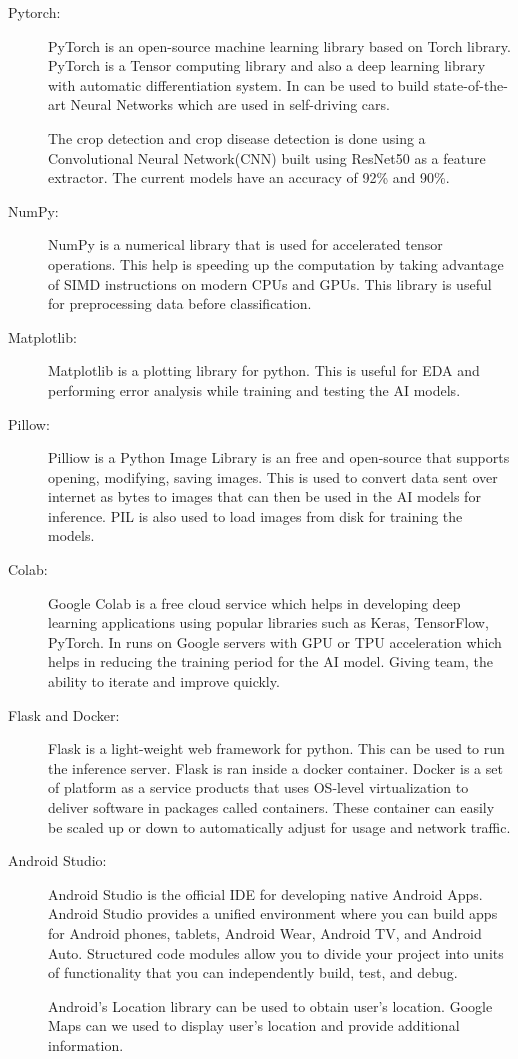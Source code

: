 \documentclass[../Report.tex]{subfiles}
\begin{document}
\begin{description}
  \item[Pytorch:] PyTorch is an open-source machine learning library based on Torch library. PyTorch is a Tensor computing library and also 
  a deep learning library with automatic differentiation system. In can be used to build state-of-the-art Neural Networks which are used in
  self-driving cars.\par
  The crop detection and crop disease detection is done using a Convolutional Neural Network(CNN) built using ResNet50 as a feature extractor.
  The current models have an accuracy of 92\% and 90\%.

  \item[NumPy:] NumPy is a numerical library that is used for accelerated tensor operations. This help is speeding up the computation by 
  taking advantage of SIMD instructions on modern CPUs and GPUs. This library is useful for preprocessing data before classification.

  \item[Matplotlib:] Matplotlib is a plotting library for python. This is useful for EDA and performing error analysis while training 
  and testing the AI models.

  \item[Pillow:] Pilliow is a Python Image Library is an free and open-source that supports opening, modifying, saving images. This is used to convert data
  sent over internet as bytes to images that can then be used in the AI models for inference. PIL is also used to load images from disk for
  training the models.

  \item[Colab:] Google Colab is a free cloud service which helps in developing deep learning applications using popular libraries such 
  as Keras, TensorFlow, PyTorch. In runs on Google servers with GPU or TPU acceleration which helps in reducing the training period for 
  the AI model. Giving team, the ability to iterate and improve quickly.

  \item[Flask and Docker:] Flask is a light-weight web framework for python. This can be used to run the inference server. Flask is ran
  inside a docker container. Docker is a set of platform as a service products that uses OS-level virtualization to deliver software in 
  packages called containers. These container can easily be scaled up or down to automatically adjust for usage and network traffic.

  \item[Android Studio:] Android Studio is the official IDE for developing native Android Apps. Android Studio provides a unified  
  environment where you can build apps for Android phones, tablets, Android Wear, Android TV, and Android Auto. Structured code modules 
  allow you to  divide your project into units of functionality that you can independently build, test, and debug.\par
  Android's Location library can be used to obtain user's location. Google Maps can we used to display user's location and provide 
  additional information.


\end{description}
\end{document}
